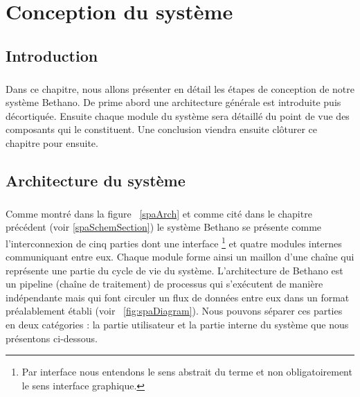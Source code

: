 \chapter{Conception du système}

\section{Introduction}
\paragraph{}
Dans ce chapitre, nous allons présenter en détail les étapes de conception de notre système Bethano. De prime abord une architecture générale est introduite puis décortiquée. Ensuite chaque module du système sera détaillé du point de vue des composants qui le constituent. Une conclusion viendra ensuite clôturer ce chapitre pour ensuite.
\section{Architecture du système}
\paragraph{}
Comme montré dans la figure ~\ref{spaArch} et comme cité dans le chapitre précédent (voir \ref{spaSchemSection}) le système Bethano se présente comme l'interconnexion de cinq parties dont une interface \footnote{Par interface nous entendons le sens abstrait du terme et non obligatoirement le sens interface graphique.} et quatre modules internes communiquant entre eux. Chaque module forme ainsi un maillon d'une chaîne qui représente une partie du cycle de vie du système. L'architecture de Bethano est un pipeline (chaîne de traitement) de processus qui s'exécutent de manière indépendante mais qui font circuler un flux de données entre eux dans un format préalablement établi (voir ~\ref{fig:spaDiagram}). Nous pouvons séparer ces parties en deux catégories : la partie utilisateur et la partie interne du système que nous présentons ci-dessous.

